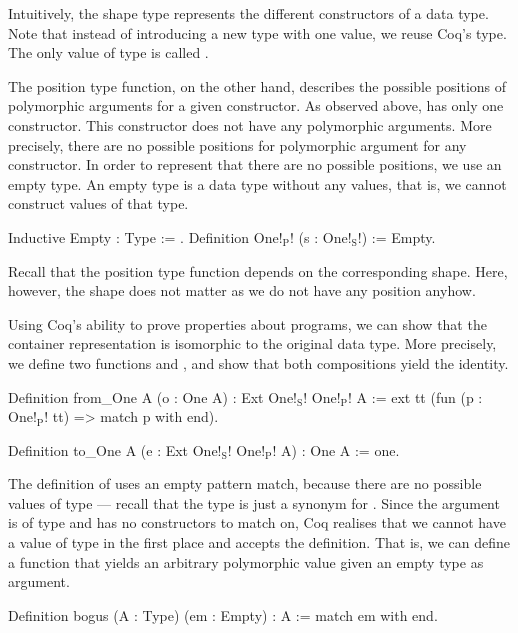 Intuitively, the shape type represents the different constructors of a data type.
Note that instead of introducing a new type with one value, we reuse Coq's  type.
The only value of type  is called .

The position type function, on the other hand, describes the possible positions of polymorphic arguments for a given constructor.
As observed above,  has only one constructor.
This constructor  does not have any polymorphic arguments.
More precisely, there are no possible positions for polymorphic argument for any constructor.
In order to represent that there are no possible positions, we use an empty type.
An empty type is a data type without any values, that is, we cannot construct values of that type.

\begin{coqcode}
Inductive Empty : Type := .
Definition One!$_\text{P}$! (s : One!$_\text{S}$!) := Empty.
\end{coqcode}
\label{code:one_container}

Recall that the position type function depends on the corresponding shape.
Here, however, the shape does not matter as we do not have any position anyhow.

Using Coq's ability to prove properties about programs, we can show that the container representation is isomorphic to the original data type.
More precisely, we define two functions  and , and show that both compositions yield the identity.

\begin{coqcode}
Definition from_One A (o : One A) : Ext One!$_\text{S}$! One!$_\text{P}$! A :=
  ext tt (fun (p : One!$_\text{P}$! tt) => match p with end).

Definition to_One A (e : Ext One!$_\text{S}$! One!$_\text{P}$! A) : One A :=
  one.
\end{coqcode}

The definition of  uses an empty pattern match, because there are no possible values of type  --- recall that the type is just a synonym for .
Since the argument  is of type  and  has no constructors to match on, Coq realises that we cannot have a value of type  in the first place and accepts the definition.
That is, we can define a function that yields an arbitrary polymorphic value given an empty type as argument.

\begin{coqcode}
Definition bogus (A : Type) (em : Empty) : A :=
  match em with end.
\end{coqcode}

